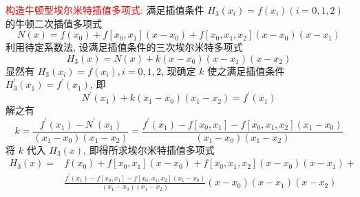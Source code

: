 \textcolor{red}{构造牛顿型埃尔米特插值多项式:}
满足插值条件 $ H_{3}\left(x_{i}\right)=f\left(x_{i}\right)(i=0,1,2) $ 的牛顿二次插值多项式
$$
N(x)=f\left(x_{0}\right)+f\left[x_{0}, x_{1}\right]\left(x-x_{0}\right)+f\left[x_{0}, x_{1}, x_{2}\right]\left(x-x_{0}\right)\left(x-x_{1}\right)
$$
利用待定系数法, 设满足插值条件的三次埃尔米特多项式
$$
H_{3}(x)=N(x)+k\left(x-x_{0}\right)\left(x-x_{1}\right)\left(x-x_{2}\right)
$$
显然有 $ H_{3}\left(x_{i}\right)=f\left(x_{i}\right), i=0,1,2 $, 现确定 $ k $ 使之满足插值条件 $ H_{3}^{\prime}\left(x_{1}\right)=f^{\prime}\left(x_{1}\right) $, 即
$$
N^{\prime}\left(x_{1}\right)+k\left(x_{1}-x_{0}\right)\left(x_{1}-x_{2}\right)=f^{\prime}\left(x_{1}\right)
$$
解之有
$$
k=\frac{f^{\prime}\left(x_{1}\right)-N^{\prime}\left(x_{1}\right)}{\left(x_{1}-x_{0}\right)\left(x_{1}-x_{2}\right)}=\frac{f^{\prime}\left(x_{1}\right)-f\left[x_{0}, x_{1}\right]-f\left[x_{0}, x_{1}, x_{2}\right]\left(x_{1}-x_{0}\right)}{\left(x_{1}-x_{0}\right)\left(x_{1}-x_{2}\right)}
$$
将 $ k $ 代入 $ H_{3}(x) $, 即得所求埃尔米特插值多项式
$$
\begin{aligned}
H_{3}(x)= & f\left(x_{0}\right)+f\left[x_{0}, x_{1}\right]\left(x-x_{0}\right)+f\left[x_{0}, x_{1}, x_{2}\right]\left(x-x_{0}\right)\left(x-x_{1}\right)+ \\
& \frac{f^{\prime}\left(x_{1}\right)-f\left[x_{0}, x_{1}\right]-f\left[x_{0}, x_{1}, x_{2}\right]\left(x_{1}-x_{0}\right)}{\left(x_{1}-x_{0}\right)\left(x_{1}-x_{2}\right)}\left(x-x_{0}\right)\left(x-x_{1}\right)\left(x-x_{2}\right)
\end{aligned}
$$



